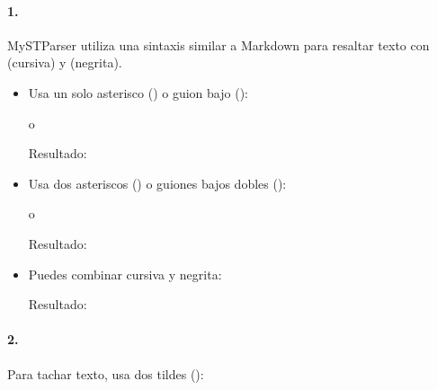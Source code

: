 \documentclass[a4paper,10pt,spanish]{sphinxmanual}
\begin{document}
\paragraph{1. }
\label{\detokenize{configuracion_inicial/013.guia_de_myst_parser:enfasis-de-texto}}
\sphinxAtStartPar
MyST\sphinxhyphen{}Parser utiliza una sintaxis similar a Markdown para resaltar texto con  (cursiva) y  (negrita).
\begin{itemize}
\item {} 
\sphinxAtStartPar
{} Usa un solo asterisco (\sphinxcode{\sphinxupquote{*}}) o guion bajo (\sphinxcode{\sphinxupquote{\_}}):

\begin{sphinxVerbatim}[commandchars=\\\{\}]
 o 
\end{sphinxVerbatim}

\sphinxAtStartPar
Resultado: 

\item {} 
\sphinxAtStartPar
{} Usa dos asteriscos (\sphinxcode{\sphinxupquote{**}}) o guiones bajos dobles (\sphinxcode{\sphinxupquote{\_\_}}):

\begin{sphinxVerbatim}[commandchars=\\\{\}]
 o 
\end{sphinxVerbatim}

\sphinxAtStartPar
Resultado: 

\item {} 
\sphinxAtStartPar
{} Puedes combinar cursiva y negrita:

\begin{sphinxVerbatim}[commandchars=\\\{\}]
\end{sphinxVerbatim}

\sphinxAtStartPar
Resultado: 

\end{itemize}


\paragraph{2. }
\label{\detokenize{configuracion_inicial/013.guia_de_myst_parser:texto-tachado}}
\sphinxAtStartPar
Para tachar texto, usa dos tildes (\sphinxcode{\sphinxupquote{\textasciitilde{}\textasciitilde{}}}):
\end{document}
